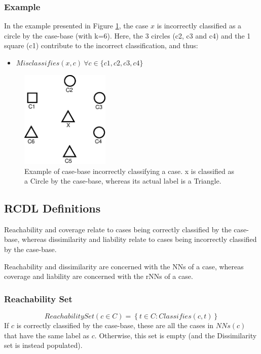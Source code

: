 \documentclass[a4paper,11pt]{report}
\begin{document}
\subsubsection{Example}

In the example presented in Figure \ref{fig:equaldistancemisclassifieseg}, the case $x$ is incorrectly classified as a circle by the case-base (with k=6). Here, the 3 circles (c2, c3 and c4) and the 1 square (c1) contribute to the incorrect classification, and thus:
\begin{itemize}
	\item $Misclassifies(x,c)~\forall c\in\{c1,c2,c3,c4\}$
\end{itemize}

\begin{figure}[h!] \centering
\includegraphics[width=120pt]{./Drawn/EqualDistanceMisclassifiesEg}
\caption{Example of case-base incorrectly classifying a case. x is classified as a Circle by the case-base, whereas its actual label is a Triangle.}
\label{fig:equaldistancemisclassifieseg}
\end{figure}

\subsection{RCDL Definitions}
Reachability and coverage relate to cases being correctly classified by the case-base, whereas dissimilarity and liability relate to cases being incorrectly classified by the case-base.

Reachability and dissimilarity are concerned with the NNs of a case, whereas coverage and liability are concerned with the rNNs of a case.

\subsubsection{Reachability Set}
\[ ReachabilitySet(c \in C) = \left\lbrace t \in C : Classifies(c, t) \right\rbrace \] 
If $c$ is correctly classified by the case-base, these are all the cases in $ NNs(c) $ that have the same label as $c$. Otherwise, this set is empty (and the Dissimilarity set is instead populated).
\end{document}
